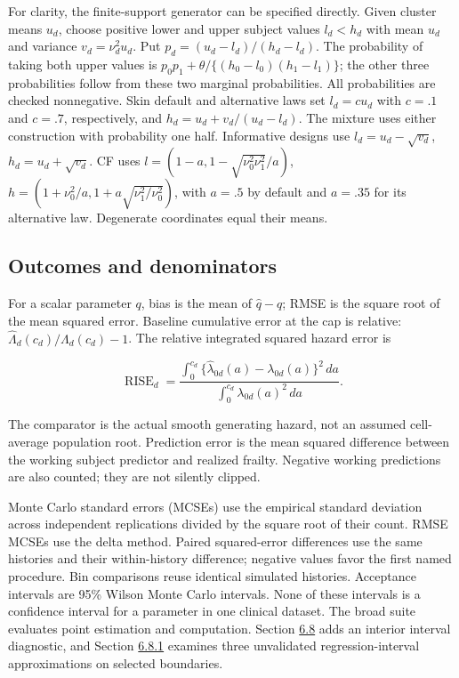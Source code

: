 \documentclass[11pt]{article}
\begin{document}
For clarity, the finite-support generator can be specified directly. Given cluster means \(u_d\), choose positive lower and upper subject values \(l_d<h_d\) with mean \(u_d\) and variance \(v_d=\nu_d^2u_d\). Put \(p_d=(u_d-l_d)/(h_d-l_d)\). The probability of taking both upper values is \(p_0p_1+\theta/\{(h_0-l_0)(h_1-l_1)\}\); the other three probabilities follow from these two marginal probabilities. All probabilities are checked nonnegative. Skin default and alternative laws set \(l_d=cu_d\) with \(c=.1\) and \(c=.7\), respectively, and \(h_d=u_d+v_d/(u_d-l_d)\). The mixture uses either construction with probability one half. Informative designs use \(l_d=u_d-\sqrt{v_d}\), \(h_d=u_d+\sqrt{v_d}\). CF uses \(l=(1-a,1-\sqrt{\nu_0^2\nu_1^2}/a)\), \(h=(1+\nu_0^2/a,1+a\sqrt{\nu_1^2/\nu_0^2})\), with \(a=.5\) by default and \(a=.35\) for its alternative law. Degenerate coordinates equal their means.

\subsection{Outcomes and denominators}\label{sec:6.2}

For a scalar parameter \(q\), bias is the mean of \(\widehat q-q\); RMSE is the square root of the mean squared error. Baseline cumulative error at the cap is relative: \(\widehat\Lambda_d(c_d)/\Lambda_d(c_d)-1\). The relative integrated squared hazard error is

\begin{equation*}
\operatorname{RISE}_d=\frac{\int_0^{c_d}\{\widehat\lambda_{0d}(a)-\lambda_{0d}(a)\}^2\,da}{\int_0^{c_d}\lambda_{0d}(a)^2\,da}.\tag{79}\label{eq:79}
\end{equation*}

The comparator is the actual smooth generating hazard, not an assumed cell-average population root. Prediction error is the mean squared difference between the working subject predictor and realized frailty. Negative working predictions are also counted; they are not silently clipped.

Monte Carlo standard errors (MCSEs) use the empirical standard deviation across independent replications divided by the square root of their count. RMSE MCSEs use the delta method. Paired squared-error differences use the same histories and their within-history difference; negative values favor the first named procedure. Bin comparisons reuse identical simulated histories. Acceptance intervals are 95\% Wilson Monte Carlo intervals. None of these intervals is a confidence interval for a parameter in one clinical dataset. The broad suite evaluates point estimation and computation. Section \hyperref[sec:6.8]{6.8} adds an interior interval diagnostic, and Section \hyperref[sec:6.8.1]{6.8.1} examines three unvalidated regression-interval approximations on selected boundaries.
\end{document}
